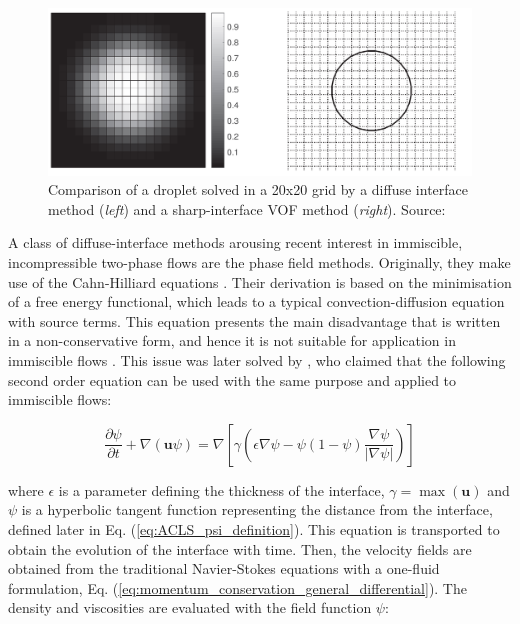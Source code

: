 \begin{figure}[h!]
	\centering
	\includegraphics[scale=0.35]{./part1_numerical_approaches/figures_ch2/DI_vs_VOF_Mirjalili}
	\caption[Comparison of a droplet solved in a 20x20 grid by a diffuse interface method  and a sharp-interface VOF method]{Comparison of a droplet solved in a 20x20 grid by a diffuse interface method (\textit{left}) and a sharp-interface VOF method (\textit{right}). Source: }
	\label{fig:DI_vs_VOF}
\end{figure}


A class of diffuse-interface methods arousing recent interest in immiscible, incompressible two-phase flows are the phase field methods. Originally, they make use of the Cahn-Hilliard equations . Their derivation is based on the minimisation of a free energy functional, which leads to a typical convection-diffusion equation with source terms. This equation presents the main disadvantage that is written in a non-conservative form, and hence it is not suitable for application in immiscible flows . This issue was later solved by , who claimed that the following second order equation can be used with the same purpose and applied to immiscible flows:

\begin{equation}
\frac{\partial \psi}{\partial t} + \nabla \left( \textbf{u}  \psi \right) = \nabla \left[ \gamma \left( \epsilon \nabla \psi - \psi \left( 1 - \psi \right) \frac{\nabla \psi}{| \nabla \psi |} \right) \right]
\end{equation}

where $\epsilon$ is a parameter defining the thickness of the interface, $\gamma = \max \left( \textbf{u} \right)$  and $\psi$ is a hyperbolic tangent function representing the distance from the interface, defined later in Eq. (\ref{eq:ACLS_psi_definition}). This equation is transported to obtain the evolution of the interface with time. Then, the velocity fields are obtained from the traditional Navier-Stokes equations with a one-fluid formulation, Eq. (\ref{eq:momentum_conservation_general_differential}). The density and viscosities are evaluated with the field function $\psi$:

